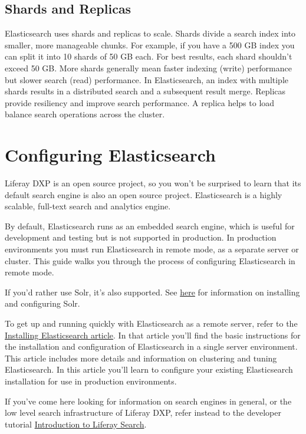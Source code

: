 \subsection{Shards and Replicas}\label{shards-and-replicas}

Elasticsearch uses shards and replicas to scale. Shards divide a search
index into smaller, more manageable chunks. For example, if you have a
500 GB index you can split it into 10 shards of 50 GB each. For best
results, each shard shouldn't exceed 50 GB. More shards generally mean
faster indexing (write) performance but slower search (read)
performance. In Elasticsearch, an index with multiple shards results in
a distributed search and a subsequent result merge. Replicas provide
resiliency and improve search performance. A replica helps to load
balance search operations across the cluster.

\section{Configuring Elasticsearch}\label{configuring-elasticsearch}

Liferay DXP is an open source project, so you won't be surprised to
learn that its default search engine is also an open source project.
Elasticsearch is a highly scalable, full-text search and analytics
engine.

By default, Elasticsearch runs as an embedded search engine, which is
useful for development and testing but is not supported in production.
In production environments you must run Elasticsearch in remote mode, as
a separate server or cluster. This guide walks you through the process
of configuring Elasticsearch in remote mode.

If you'd rather use Solr, it's also supported. See
\href{/docs/7-0/deploy/-/knowledge_base/d/using-solr}{here} for
information on installing and configuring Solr.

To get up and running quickly with Elasticsearch as a remote server,
refer to the
\href{/docs/7-0/deploy/-/knowledge_base/d/installing-elasticsearch}{Installing
Elasticsearch article}. In that article you'll find the basic
instructions for the installation and configuration of Elasticsearch in
a single server environment. This article includes more details and
information on clustering and tuning Elasticsearch. In this article
you'll learn to configure your existing Elasticsearch installation for
use in production environments.

If you've come here looking for information on search engines in
general, or the low level search infrastructure of Liferay DXP, refer
instead to the developer tutorial
\href{/docs/7-0/tutorials/-/knowledge_base/t/introduction-to-liferay-search}{Introduction
to Liferay Search}.

